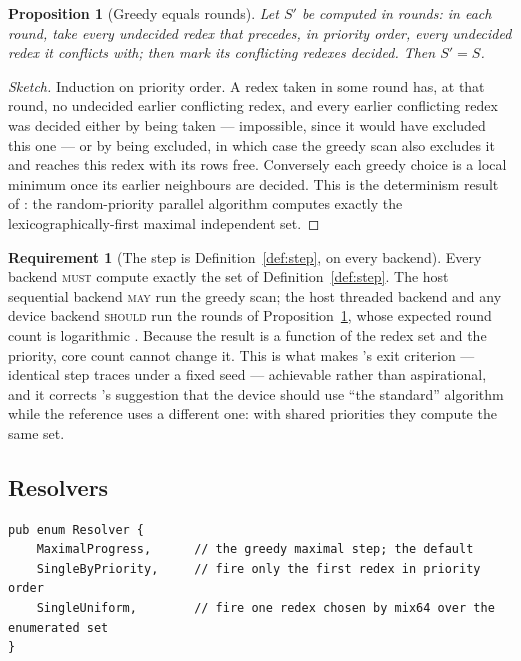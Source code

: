 \documentclass[11pt,a4paper]{article}
\newcommand{\MUST}{\textsc{must}}
\newcommand{\SHOULD}{\textsc{should}}
\newcommand{\MAY}{\textsc{may}}
\theoremstyle{definition}
\newtheorem{requirement}[definition]{Requirement}
\theoremstyle{plain}
\newtheorem{proposition}[definition]{Proposition}
\begin{document}
\begin{proposition}[Greedy equals rounds]\label{prop:greedyrounds}
Let $S'$ be computed in rounds: in each round, take every undecided redex
that precedes, in priority order, every undecided redex it conflicts with;
then mark its conflicting redexes decided. Then $S' = S$.
\end{proposition}

\begin{proof}[Sketch]
Induction on priority order. A redex taken in some round has, at that
round, no undecided earlier conflicting redex, and every earlier conflicting
redex was decided either by being taken --- impossible, since it would have
excluded this one --- or by being excluded, in which case the greedy scan also
excludes it and reaches this redex with its rows free. Conversely each greedy
choice is a local minimum once its earlier neighbours are decided. This is
the determinism result of \cite{bfs}: the random-priority parallel algorithm
computes exactly the lexicographically-first maximal independent set.
\end{proof}

\begin{requirement}[The step is Definition~\ref{def:step}, on every backend]
\label{req:stepdef}
Every backend \MUST{} compute exactly the set of
Definition~\ref{def:step}. The host sequential backend \MAY{} run the greedy
scan; the host threaded backend and any device backend \SHOULD{} run the
rounds of Proposition~\ref{prop:greedyrounds}, whose expected round count is
logarithmic \cite{bfs}. Because the result is a function of the redex set and
the priority, core count cannot change it. This is what makes
\cite[P4]{matnote}'s exit criterion --- identical step traces under a fixed
seed --- achievable rather than aspirational, and it corrects
\cite[Rem.~8.7]{matnote}'s suggestion that the device should use ``the
standard'' algorithm while the reference uses a different one: with shared
priorities they compute the same set.
\end{requirement}

\subsection{Resolvers}

\begin{lstlisting}
pub enum Resolver {
    MaximalProgress,      // the greedy maximal step; the default
    SingleByPriority,     // fire only the first redex in priority order
    SingleUniform,        // fire one redex chosen by mix64 over the enumerated set
}
\end{lstlisting}
\end{document}
